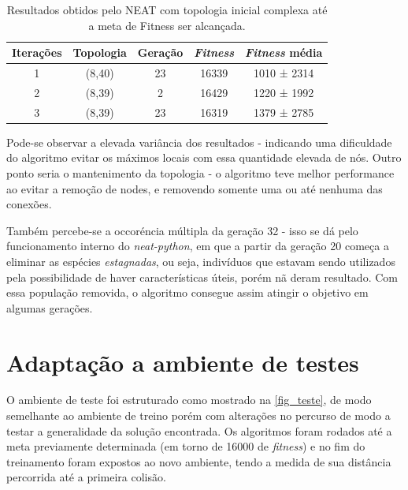 \begin{table}[htb]
	\centering
    \caption{\label{tabela_neatc}Resultados obtidos pelo NEAT com topologia inicial complexa até a meta de Fitness ser alcançada.}
    \begin{tabular}{ccccc}
        \hline
		\textbf{Itera{\c c}{\~o}es} & \textbf{Topologia} & \textbf{Gera{\c c}{\~a}o} & \textbf{\textit{Fitness}} & \textbf{\textit{Fitness} média} \\ \hline
		1 & (8,40)  & 23  & 16339  & 1010 ± 2314   \\ \hline
		2 & (8,39)  & 2   & 16429  & 1220 ± 1992   \\ \hline
		3 & (8,39)  & 23  & 16319  & 1379 ± 2785   \\ \hline
    \end{tabular}
\end{table}

Pode-se observar a elevada vari{\^a}ncia dos resultados - indicando uma
dificuldade do algoritmo evitar os m{\'a}ximos locais com essa quantidade
elevada de n{\'o}s. Outro ponto seria o mantenimento da topologia - o algoritmo
teve melhor performance ao evitar a remo{\c c}{\~a}o de nodes, e removendo
somente uma ou at{\'e} nenhuma das conex{\~o}es.

Tamb{\'e}m percebe-se a occor{\'e}ncia m{\'u}ltipla da gera{\c c}{\~a}o 32 -
isso se d{\'a} pelo funcionamento interno do \textit{neat-python}, em que a
partir da gera{\c c}{\~a}o 20 come{\c c}a a eliminar as esp{\'e}cies
\textit{estagnadas}, ou seja, indiv{\'i}duos que estavam sendo utilizados pela
possibilidade de haver caracter{\'i}sticas {\'u}teis, por{\'e}m n{\~a} deram
resultado. Com essa popula{\c c}{\~a}o removida, o algoritmo consegue assim
atingir o objetivo em algumas gera{\c c}{\~o}es.

\section{Adapta{\c c}{\~a}o a ambiente de testes}

O ambiente de teste foi estruturado como mostrado na \autoref{fig_teste}, de
modo semelhante ao ambiente de treino por{\'e}m com altera{\c c}{\~o}es no
percurso de modo a testar a generalidade da solu{\c c}{\~a}o encontrada. Os
algoritmos foram rodados at{\'e} a meta previamente determinada (em torno de
16000 de \textit{fitness}) e no fim do treinamento foram expostos ao novo
ambiente, tendo a medida de sua dist{\^a}ncia percorrida at{\'e} a primeira
colis{\~a}o.

